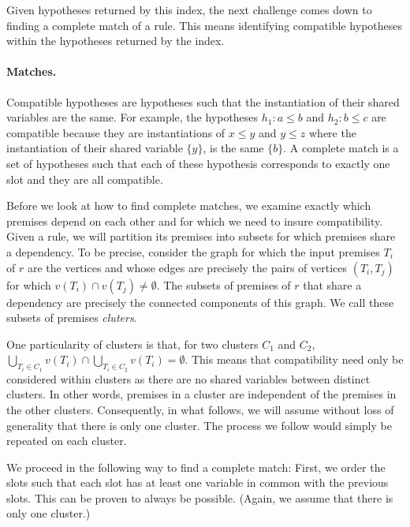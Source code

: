 \documentclass[runningheads]{llncs}
\newcommand{\xcom}[1]{{\color{cyan}{Xavier: #1}} }
\begin{document}
Given hypotheses returned by this index, the next challenge comes down to finding a complete match of a rule.
This means identifying compatible hypotheses within the hypotheses returned by the index.

\paragraph{Matches.}
Compatible hypotheses are hypotheses such that the instantiation of their shared variables are the same.
For example, the hypotheses $h_1 : a \leq b$ and $h_2 : b \leq c$ are compatible because they are instantiations of $x \leq y$ and $y \leq z$ where the instantiation of their shared variable $\{y\}$, is the same $\{b\}$.
A complete match is a set of hypotheses such that each of these hypothesis corresponds to exactly one slot and they are all compatible.

Before we look at how to find complete matches, we examine exactly which premises depend on each other and for which we need to insure compatibility.
Given a rule, we will partition its premises into subsets for which premises share a dependency.
To be precise, consider the graph for which the input premises $T_i$ of $r$ are the vertices and whose edges are precisely the pairs of vertices $(T_i, T_j)$ for which $v(T_i) \cap v(T_j) \neq \emptyset$.
The subsets of premises of $r$ that share a dependency are precisely the connected components of this graph.
We call these subsets of premises \textit{cluters}.


One particularity of clusters is that, for two clusters $C_1$ and $C_2$,
$\bigcup_{T_i \in C_1} v(T_i) \cap \bigcup_{T_i \in C_2} v(T_i) = \emptyset$.
This means that compatibility need only be considered within clusters as there are no shared variables between distinct clusters.
In other words, premises in a cluster are independent of the premises in the other clusters.
Consequently, in what follows, we will assume without loss of generality that there is only one cluster.
The process we follow would simply be repeated on each cluster.

We proceed in the following way to find a complete match:
First, we order the slots such that each slot has at least one variable in common with the previous slots.
This can be proven to always be possible.
(Again, we assume that there is only one cluster.)
\xcom{We can add the proof if we want to / have space.}
\end{document}
